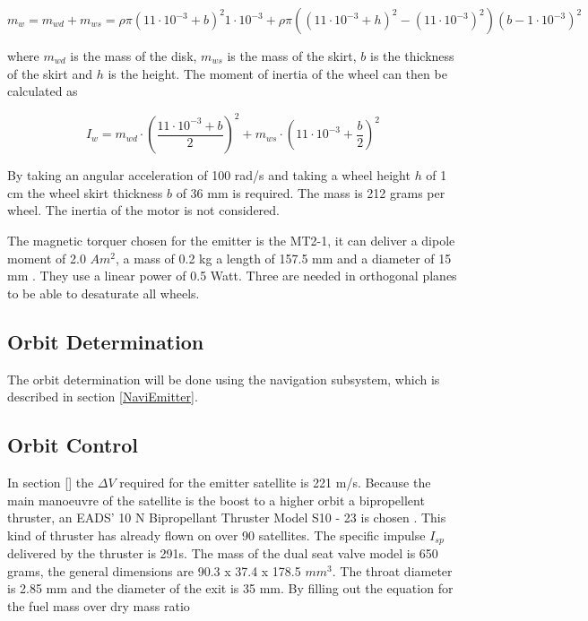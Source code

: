 \begin{equation}
m_w = m_{wd} + m_{ws} = \rho \pi \left(11\cdot 10^{-3}+b\right)^2 1\cdot 10^{-3} + \rho \pi \left(\left(11\cdot 10^{-3}+h\right)^2 - \left(11\cdot 10^{-3}\right)^2\right)\left(b-1\cdot 10^{-3}\right)^2
\end{equation}

where $m_{wd}$ is the mass of the disk, $m_{ws}$ is the mass of the skirt, $b$ is the thickness of the skirt and $h$ is the height. The moment of inertia of the wheel can then be calculated as

\begin{equation}
I_w =  m_{wd} \cdot \left(\frac{11\cdot 10^{-3}+b}{2}\right)^2  + m_{ws} \cdot \left(11\cdot 10^{-3}+\frac{b}{2}\right)^2
\end{equation}

By taking an angular acceleration of 100 rad/s and taking a wheel height $h$ of 1 cm the wheel skirt thickness $b$ of 36 mm is required. The mass is 212 grams per wheel. The inertia of the motor is not considered.

The magnetic torquer chosen for the emitter is the MT2-1, it can deliver a dipole moment of 2.0 $Am^2$, a mass of 0.2 kg a length of 157.5 mm and a diameter of 15 mm \cite{zarm}. They use a linear power of 0.5 Watt. Three are needed in orthogonal planes to be able to desaturate all wheels.

\subsection{Orbit Determination}
\label{ss:emDDods}
The orbit determination will be done using the navigation subsystem, which is described in section \ref{NaviEmitter}.

\subsection{Orbit Control}
\label{ss:emDDocs}
In section \ref{} the $\Delta V$ required for the emitter satellite is 221 m/s. Because the main manoeuvre of the satellite is the boost to a higher orbit a bipropellent thruster, an EADS' 10 N Bipropellant Thruster Model S10 - 23 is chosen \cite{10Nthruster}. This kind of thruster has already flown on over 90 satellites. The specific impulse $I_{sp}$ delivered by the thruster is 291s. The mass of the dual seat valve model is 650 grams, the general dimensions are 90.3 x 37.4 x 178.5 $mm^3$. The throat diameter is 2.85 mm and the diameter of the exit is 35 mm. By filling out the equation for the fuel mass over dry mass ratio


